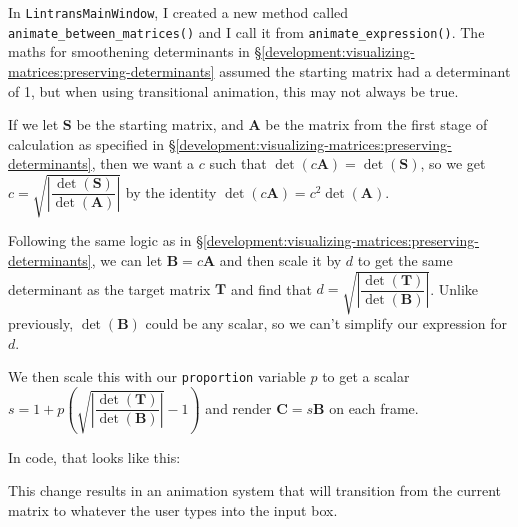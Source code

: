 \documentclass[../development.tex]{subfiles}
\begin{document}
In \texttt{LintransMainWindow}, I created a new method called \texttt{animate\_between\_matrices()} and I call it from \texttt{animate\_expression()}. The maths for smoothening determinants in \S\ref{development:visualizing-matrices:preserving-determinants} assumed the starting matrix had a determinant of 1, but when using transitional animation, this may not always be true.

If we let $\mathbf{S}$ be the starting matrix, and $\mathbf{A}$ be the matrix from the first stage of calculation as specified in \S\ref{development:visualizing-matrices:preserving-determinants}, then we want a $c$ such that $\det(c\mathbf{A}) = \det(\mathbf{S})$, so we get $c = \sqrt{\left|\dfrac{\det(\mathbf{S})}{\det(\mathbf{A})}\right|}$ by the identity $\det(c\mathbf{A}) = c^2 \det(\mathbf{A})$.

Following the same logic as in \S\ref{development:visualizing-matrices:preserving-determinants}, we can let $\mathbf{B} = c\mathbf{A}$ and then scale it by $d$ to get the same determinant as the target matrix $\mathbf{T}$ and find that $d = \sqrt{\left|\dfrac{\det(\mathbf{T})}{\det(\mathbf{B})}\right|}$. Unlike previously, $\det(\mathbf{B})$ could be any scalar, so we can't simplify our expression for $d$.

We then scale this with our \texttt{proportion} variable $p$ to get a scalar $s = 1 + p\left(\sqrt{\left|\dfrac{\det(\mathbf{T})}{\det(\mathbf{B})}\right|} - 1\right)$ and render $\mathbf{C} = s\mathbf{B}$ on each frame.

In code, that looks like this:


This change results in an animation system that will transition from the current matrix to whatever the user types into the input box.
\end{document}
